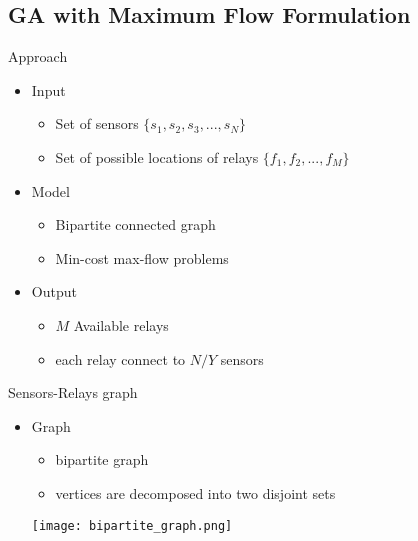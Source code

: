 \documentclass[main.tex]{subfiles}
\begin{document}
\subsection{GA with Maximum Flow Formulation}
\begin{frame}{Approach}
\begin{itemize}
	\item Input
	\begin{itemize}
		\item Set of sensors $\{s_1, s_2, s_3, ... , s_N\}$
		\item Set of possible locations of relays $\{f_1, f_2, ..., f_M\}$
	\end{itemize}
	\item Model
	\begin{itemize}
		\item Bipartite connected graph
		\item Min-cost max-flow problems
	\end{itemize}
	\item Output
	\begin{itemize}
		\item $M$ Available relays
		\item each relay connect to $N/Y$ sensors
	\end{itemize}
\end{itemize}
\end{frame}


\begin{frame}{Sensors-Relays graph}
\begin{itemize}
	\item Graph
	\begin{itemize}
		\item bipartite graph
		\item vertices are decomposed into two disjoint sets
	\end{itemize}
	\begin{center}
		\texttt{[image: bipartite\_graph.png]}
	\end{center}
	
	
\end{itemize}
\end{frame}
\end{document}
